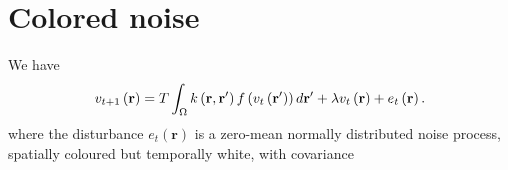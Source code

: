 \documentclass[onecolumn,draftcls]{IEEEtran}
\begin{document}

\section{Colored noise}
We have
\begin{equation}
v_{t + 1}\left( \mathbf{r} \right)  = T\int_\Omega  {k\left( {{\bf{r}} , {\bf{r'}}} \right)f\left( {{v_t}\left( \bf{r'} \right)} \right)d{\bf{r'}}} + \lambda v_t\left( {\bf{r}} \right) +e_t\left( {\mathbf{r}} \right).
\end{equation}
where the disturbance $e_t(\mathbf r)$ is a zero-mean normally distributed noise process, spatially coloured but temporally white, with covariance 
\end{document}
